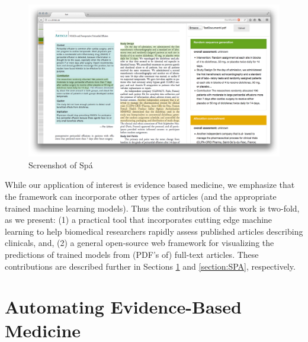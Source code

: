 \documentclass[runningheads,a4paper]{llncs}
\begin{document}
\begin{figure}[htb]
\centering
\includegraphics[width=.9\linewidth]{./screenshot.png}
\caption{Screenshot of Sp{\'a}}
\end{figure}

While our application of interest is evidence based medicine, we emphasize that the framework can incorporate other types of articles (and the appropriate trained machine learning models). Thus the contribution of this work is two-fold, as we present: (1) a practical tool that incorporates cutting edge machine learning to help biomedical researchers rapidly assess published articles describing clinicals, and, (2) a general open-source web framework for visualizing the predictions of trained models from (PDF's of) full-text articles. These contributions are described further in Sections \ref{section:EBM-ML} and \ref{section:SPA}, respectively.

\section{Automating Evidence-Based Medicine}
\label{section:EBM-ML}



\end{document}
